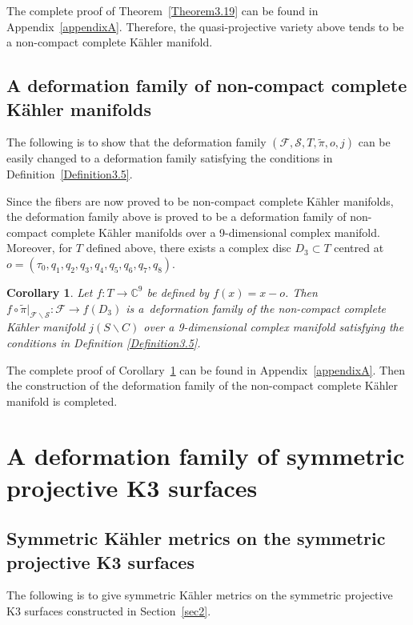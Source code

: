 \documentclass[10pt,a4paper]{amsart}
\numberwithin{equation}{section}
\newtheorem{Corollary}[Theorem]{Corollary}
\begin{document}
The complete proof of Theorem~\ref{Theorem3.19} can be found in Appendix~\ref{appendixA}. Therefore, the quasi-projective variety above tends to be a non-compact complete K\"ahler manifold.

\subsection{A deformation family of non-compact complete K\"ahler manifolds}

The following is to show that the deformation family $(\mathcal{F},\mathcal{S},T,\widetilde{\pi},o,j)$ can be easily changed to a deformation family satisfying the conditions in Definition~\ref{Definition3.5}.

Since the fibers are now proved to be non-compact complete K\"ahler manifolds, the deformation family above is proved to be a deformation family of non-compact complete K\"ahler manifolds over a 9-dimensional complex manifold.
Moreover, for $T$ defined above, there exists a complex disc $D_3 \subset T$ centred at $o=(\tau_0,q_1,q_2,q_3,q_4,q_5,q_6,q_7,q_8)$.

\begin{Corollary} \label{Corollary3.20}
Let $f\colon T \rightarrow \mathbb{C}^9$ be defined by $f(x)=x-o$. Then $f \circ \widetilde{\pi}|_{\mathcal{F}\backslash \mathcal{S}}\colon\mathcal{F} \rightarrow f(D_3)$ is a~deformation family of the non-compact complete K\"ahler manifold $j(S\backslash C)$ over a 9-dimensional complex manifold satisfying the conditions in Definition {\rm\ref{Definition3.5}}.
\end{Corollary}

The complete proof of Corollary~\ref{Corollary3.20} can be found in Appendix~\ref{appendixA}. Then the construction of the deformation family of the non-compact complete K\"ahler manifold is completed.

\section{A deformation family of symmetric projective K3 surfaces}\label{sec4}

\subsection{Symmetric K\"ahler metrics on the symmetric projective K3 surfaces}

The following is to give symmetric K\"ahler metrics on the symmetric projective K3 surfaces constructed in Section~\ref{sec2}.
\end{document}
